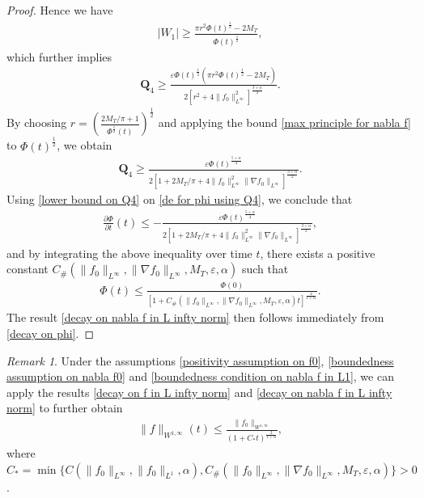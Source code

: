 \documentclass[reqno]{amsart}%
\theoremstyle{definition}
\theoremstyle{remark}
\newtheorem{rem}[thm]{Remark}
\numberwithin{equation}{section}
\newcommand{\0}{\mathbf{0}}
\newcommand{\1}{\mathbf{1}}
\numberwithin{equation}{section}
\numberwithin{theorem}{section}
\numberwithin{figure}{section}
\begin{document}
\begin{proof}
Hence we have
\begin{align*}
|W_1|\ge\frac{\pi r^2\Phi(t)^\frac{1}{2}-2M_T}{\Phi(t)^\frac{1}{2}},
\end{align*}
which further implies
\begin{align*}
\mathbf{Q}_4\ge\frac{\varepsilon\Phi(t)^\frac{1}{2}(\pi r^2\Phi(t)^\frac{1}{2}-2M_T)}{2[r^2+4\|f_0\|^2_{L^\infty}]^\frac{3+\alpha}{2}}.
\end{align*}
By choosing $r=\left(\frac{2M_T/\pi + 1}{\Phi^\frac{1}{2}(t)}\right)^\frac{1}{2}$ and applying the bound \eqref{max principle for nabla f} to $\Phi(t)^\frac{1}{2}$, we obtain
\begin{align}\label{lower bound on Q4}
\mathbf{Q}_4\ge\frac{\varepsilon\Phi(t)^\frac{5+\alpha}{4}}{2[1+2M_T/\pi+4\|f_0\|^2_{L^\infty}\|\nabla f_0\|_{L^\infty}]^\frac{3+\alpha}{2}}.
\end{align}
Using \eqref{lower bound on Q4} on \eqref{de for phi using Q4}, we conclude that
\begin{align*}
\frac{\partial\Phi}{\partial t}(t)\le -\frac{\varepsilon\Phi(t)^\frac{5+\alpha}{4}}{2[1+2M_T/\pi+4\|f_0\|^2_{L^\infty}\|\nabla f_0\|_{L^\infty}]^\frac{3+\alpha}{2}},
\end{align*}
and by integrating the above inequality over time $t$, there exists a positive constant $C_{\#}(\|f_0\|_{L^\infty},\|\nabla f_0\|_{L^\infty},M_{T},\varepsilon,\alpha)$ such that
\begin{align}\label{decay on phi}
\Phi(t)\le\frac{\Phi(0)}{[1+C_{\#}(\|f_0\|_{L^\infty},\|\nabla f_0\|_{L^\infty},M_{T},\varepsilon,\alpha)t]^\frac{4}{1+\alpha}}.
\end{align}
The result \eqref{decay on nabla f in L infty norm} then follows immediately from \eqref{decay on phi}.
\end{proof}
\begin{rem}
Under the assumptions \eqref{positivity assumption on f0}, \eqref{boundedness assumption on nabla f0} and \eqref{boundedness condition on nabla f in L1}, we can apply the results \eqref{decay on f in L infty norm} and \eqref{decay on nabla f in L infty norm} to further obtain
\begin{align}\label{decay on f in W 1,infty norm}
\|f\|_{W^{1,\infty}}(t)\le\frac{\|f_0\|_{W^{1,\infty}}}{(1+C_{*}t)^\frac{2}{1+\alpha}},
\end{align}
where $C_*=\min\{C(\|f_0\|_{L^\infty},\|f_0\|_{L^1},\alpha),C_{\#}(\|f_0\|_{L^\infty},\|\nabla f_0\|_{L^\infty},M_{T},\varepsilon,\alpha)\}>0$.
\end{rem}
\end{document}

